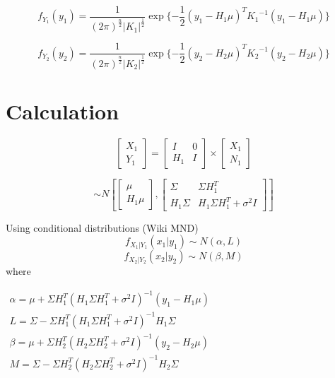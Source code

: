 \documentclass[11pt]{article} %
\begin{document}
\begin{equation}
f_{Y_1}(y_1) = \frac{1}{({2\pi})^{\frac{n}{2}} {|K_1|}^{\frac{1}{2}}} \exp\{-\frac{1}{2}{(y_1-H_1\mu)}^T {K_1}^{-1}(y_1-H_1\mu)\}
\end{equation}

\begin{equation}
f_{Y_2}(y_2) = \frac{1}{({2\pi})^{\frac{n}{2}} {|K_2|}^{\frac{1}{2}}} \exp\{-\frac{1}{2}{(y_2-H_2\mu)}^T {K_2}^{-1}(y_2-H_2\mu)\}
\end{equation}





\section{ Calculation}

\begin{equation}
 \left[\begin{array}{c} X_1 \\ Y_1 \end{array}\right] = 
\begin{bmatrix} I & 0 \\ H_1 & I \end{bmatrix} \times \left[ \begin{array}{c} X_1 \\ N_1 \end{array} \right]      
\end{equation}

\begin{equation}
 \sim N \left[\begin{bmatrix} \mu \\ H_1 \mu \end{bmatrix}, \begin{bmatrix} \Sigma & \Sigma H_1^T \\ H_1 \Sigma & H_1 \Sigma H_1^T + \sigma^2 I \end{bmatrix} \right]
\end{equation}

\noindent
Using conditional distributions (Wiki MND)
 \begin{equation}
  f_{X_1|Y_1}(x_1|y_1) \sim N(\alpha, L)
 \end{equation}
\begin{equation}
  f_{X_2|Y_2}(x_2|y_2) \sim N(\beta, M)
 \end{equation}
where 

$\begin{array}{l}\alpha = \mu + \Sigma H_1^T (H_1 \Sigma H_1^T + \sigma^2 I)^{-1} (y_1 - H_1 \mu) \\ L = \Sigma - \Sigma H_1^T (H_1 \Sigma H_1^T + \sigma^2 I)^{-1} H_1 \Sigma \\ \beta = \mu + \Sigma H_2^T (H_2 \Sigma H_2^T + \sigma^2 I)^{-1} (y_2 - H_2 \mu) \\ M = \Sigma - \Sigma H_2^T (H_2 \Sigma H_2^T + \sigma^2 I)^{-1} H_2 \Sigma        \end{array}$
         
\end{document}
